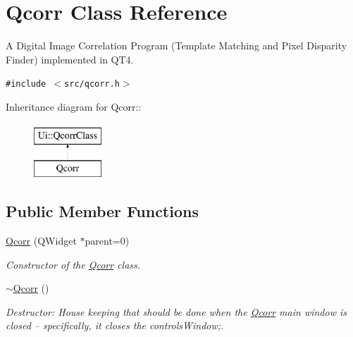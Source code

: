 \hypertarget{classQcorr}{
\section{Qcorr Class Reference}
\label{classQcorr}
}
A Digital Image Correlation Program (Template Matching and Pixel Disparity Finder) implemented in QT4.  


{\tt \#include $<$src/qcorr.h$>$}

Inheritance diagram for Qcorr::\begin{figure}[H]
\begin{center}
\leavevmode
\includegraphics[height=2cm]{classQcorr}
\end{center}
\end{figure}
\subsection*{Public Member Functions}
\begin{CompactItemize}
\item 
\hypertarget{classQcorr_3b5d03aed21bfd00497ff265d898e45b}{
\hyperlink{classQcorr_3b5d03aed21bfd00497ff265d898e45b}{Qcorr} (QWidget $\ast$parent=0)}
\label{classQcorr_3b5d03aed21bfd00497ff265d898e45b}

\begin{CompactList}\small\item\em Constructor of the \hyperlink{classQcorr}{Qcorr} class. \item\end{CompactList}\item 
\hypertarget{classQcorr_c228e26878cd0b63b162f1680ab4f4fd}{
\hyperlink{classQcorr_c228e26878cd0b63b162f1680ab4f4fd}{$\sim$Qcorr} ()}
\label{classQcorr_c228e26878cd0b63b162f1680ab4f4fd}

\begin{CompactList}\small\item\em Destructor: House keeping that should be done when the \hyperlink{classQcorr}{Qcorr} main window is closed -- specifically, it closes the controlsWindow;. \item\end{CompactList}\end{CompactItemize}

